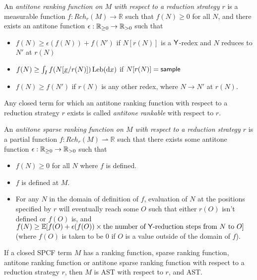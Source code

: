 \begin{definition}\rm
An \emph{antitone ranking function on $M$ with respect to a reduction strategy $r$} is a measurable function $f:\mathit{Rch}_r(M) \to \mathbb{R}$ such that $f(N) \geq 0$ for all $N$, and there exists an antitone function $\epsilon : \mathbb{R}_{{\geq}0} \to \mathbb{R}_{{>}0}$ such that
\begin{itemize}
    \item $f(N) \geq \epsilon(f(N)) + f(N')$ if $N[r(N)]$ is a $\mathsf{Y}$-redex and $N$ reduces to $N'$ at $r(N)$
    \item $f(N) \geq \int_I f(N[\underline{x}/r(N)]) \, \mathrm{Leb}(\mathrm{d}x)$ if $N[r(N)] = \mathsf{sample}$

    \item $f(N) \geq f(N')$ if $r(N)$ is any other redex, where $N \to N'$ at $r(N)$.
\end{itemize}
Any closed term for which an antitone ranking function with respect to a reduction strategy $r$ exists is called \emph{antitone rankable} with respect to $r$. 
\end{definition}

\begin{definition}
An \emph{antitone sparse ranking function on $M$ with respect to a reduction strategy $r$} is a partial function $f : Rch_r(M) \rightharpoonup \mathbb R$ such that there exists some antitone function $\epsilon : \mathbb{R}_{{\geq}0} \to \mathbb{R}_{{>}0}$ such that
\begin{itemize}
    \item $f(N) \geq 0$ for all $N$ where $f$ is defined.
    \item $f$ is defined at $M$.
    \item For any $N$ in the domain of definition of $f$, evaluation of $N$ at the positions specified by $r$ will eventually reach some $O$ such that either $r(O)$ isn't defined or $f(O)$ is, and $f(N) \geq \mathbb E[f(O) + \epsilon(f(O)) \times \text{the number of $\mathsf{Y}$-reduction steps from $N$ to $O$}]$ (where $f(O)$ is taken to be 0 if $O$ is a value outside of the domain of $f$).
\end{itemize}
\end{definition}

\begin{theorem}
If a closed SPCF term $M$ has a ranking function, sparse ranking function, antitone ranking function or antitone sparse ranking function with respect to a reduction strategy $r$, then $M$ is AST with respect to $r$, and AST.
\end{theorem}

